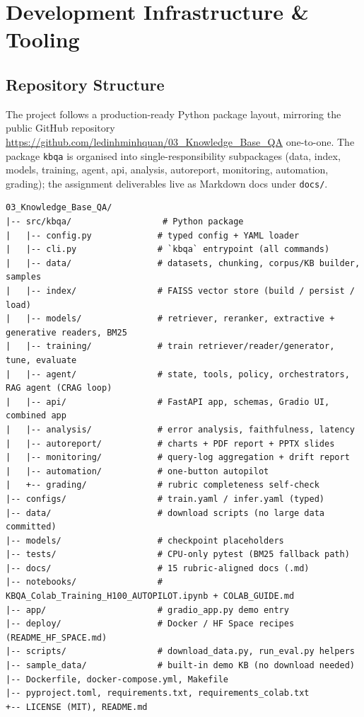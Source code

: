 \documentclass[12pt,a4paper]{article}
\begin{document}
\section{Development Infrastructure \& Tooling}

\subsection{Repository Structure}

The project follows a production-ready Python package layout, mirroring the public GitHub repository \url{https://github.com/ledinhminhquan/03_Knowledge_Base_QA} one-to-one. The package \texttt{kbqa} is organised into single-responsibility subpackages (data, index, models, training, agent, api, analysis, autoreport, monitoring, automation, grading); the assignment deliverables live as Markdown docs under \texttt{docs/}.

\begin{lstlisting}[basicstyle=\ttfamily\footnotesize]
03_Knowledge_Base_QA/
|-- src/kbqa/                  # Python package
|   |-- config.py             # typed config + YAML loader
|   |-- cli.py                # `kbqa` entrypoint (all commands)
|   |-- data/                 # datasets, chunking, corpus/KB builder, samples
|   |-- index/                # FAISS vector store (build / persist / load)
|   |-- models/               # retriever, reranker, extractive + generative readers, BM25
|   |-- training/             # train retriever/reader/generator, tune, evaluate
|   |-- agent/                # state, tools, policy, orchestrators, RAG agent (CRAG loop)
|   |-- api/                  # FastAPI app, schemas, Gradio UI, combined app
|   |-- analysis/             # error analysis, faithfulness, latency
|   |-- autoreport/           # charts + PDF report + PPTX slides
|   |-- monitoring/           # query-log aggregation + drift report
|   |-- automation/           # one-button autopilot
|   +-- grading/              # rubric completeness self-check
|-- configs/                  # train.yaml / infer.yaml (typed)
|-- data/                     # download scripts (no large data committed)
|-- models/                   # checkpoint placeholders
|-- tests/                    # CPU-only pytest (BM25 fallback path)
|-- docs/                     # 15 rubric-aligned docs (.md)
|-- notebooks/                # KBQA_Colab_Training_H100_AUTOPILOT.ipynb + COLAB_GUIDE.md
|-- app/                      # gradio_app.py demo entry
|-- deploy/                   # Docker / HF Space recipes (README_HF_SPACE.md)
|-- scripts/                  # download_data.py, run_eval.py helpers
|-- sample_data/              # built-in demo KB (no download needed)
|-- Dockerfile, docker-compose.yml, Makefile
|-- pyproject.toml, requirements.txt, requirements_colab.txt
+-- LICENSE (MIT), README.md
\end{lstlisting}
\end{document}
